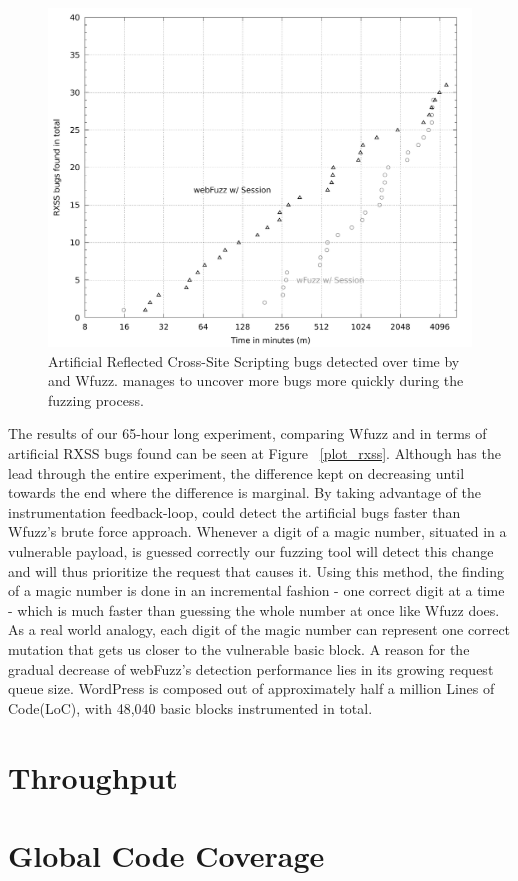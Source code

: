 \begin{figure}[!htb]
  \centering \includegraphics[width=\linewidth]{figures/plot_bugs.pdf}
  \caption{ Artificial Reflected Cross-Site Scripting bugs detected over time by \pname{} and Wfuzz. \pname{} manages to uncover more bugs more quickly during the fuzzing process.} 
  \label{fig:plot_rxss}
\end{figure}

The results of our 65-hour long experiment, comparing Wfuzz and \pname{} in terms of artificial RXSS bugs found can be seen at Figure ~\ref{plot_rxss}. Although \pname{} has the lead through the entire experiment, the difference kept on decreasing until towards the end where the difference is marginal. By taking advantage of the instrumentation feedback-loop, \pname{} could detect the artificial bugs faster than Wfuzz's brute force approach. Whenever a digit of a magic
number, situated in a vulnerable payload, is guessed correctly our fuzzing tool will detect this change and will thus prioritize the request that causes it. Using this method, the finding of a magic number is done in an incremental fashion - one correct digit at a time - which is much faster than guessing the whole number at once like Wfuzz does. As a real world analogy, each digit of the magic number can represent one correct mutation that gets us closer to the vulnerable basic block. A reason for the gradual decrease of webFuzz's detection performance lies in its growing request queue size. WordPress is composed out of approximately half a million Lines of Code(LoC), with 48,040 basic blocks instrumented in total.

\section{Throughput}

\section{Global Code Coverage}
